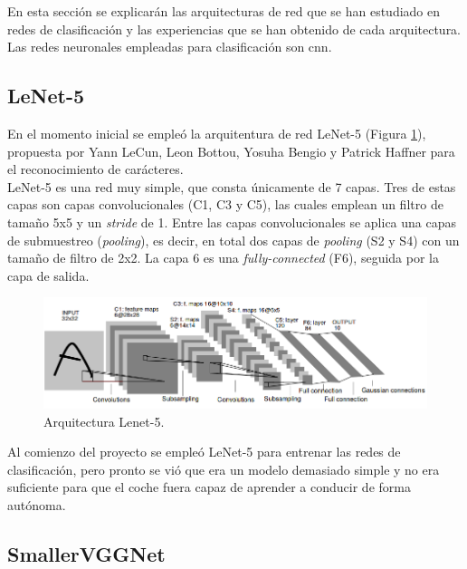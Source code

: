 En esta sección se explicarán las arquitecturas de red que se han estudiado en redes de clasificación y las experiencias que se han obtenido de cada arquitectura. Las redes neuronales empleadas para clasificación son \acrshort{cnn}.

\subsection{LeNet-5}

En el momento inicial se empleó la arquitentura de red LeNet-5 \cite{LeCunGradient} (Figura \ref{fig.Lenet}), propuesta por Yann LeCun, Leon Bottou, Yosuha Bengio y Patrick Haffner para el reconocimiento de carácteres.\\

LeNet-5 es una red muy simple, que consta únicamente de 7 capas. Tres de estas capas son capas convolucionales (C1, C3 y C5), las cuales emplean un filtro de tamaño 5x5 y un \textit{stride} de 1. Entre las capas convolucionales se aplica una capas de submuestreo (\textit{pooling}), es decir, en total dos capas de \textit{pooling} (S2 y S4) con un tamaño de filtro de 2x2. La capa 6 es una \textit{fully-connected} (F6), seguida por la capa de salida.\\

\begin{figure}
\begin{center}
	\includegraphics[width=1\textwidth]{figures/Clasificacion/model_lenet.png}
   \caption{Arquitectura Lenet-5.}
	\label{fig.Lenet}
\end{center}
\end{figure}

Al comienzo del proyecto se empleó LeNet-5 para entrenar las redes de clasificación, pero pronto se vió que era un modelo demasiado simple y no era suficiente para que el coche fuera capaz de aprender a conducir de forma autónoma. 

\subsection{SmallerVGGNet}

